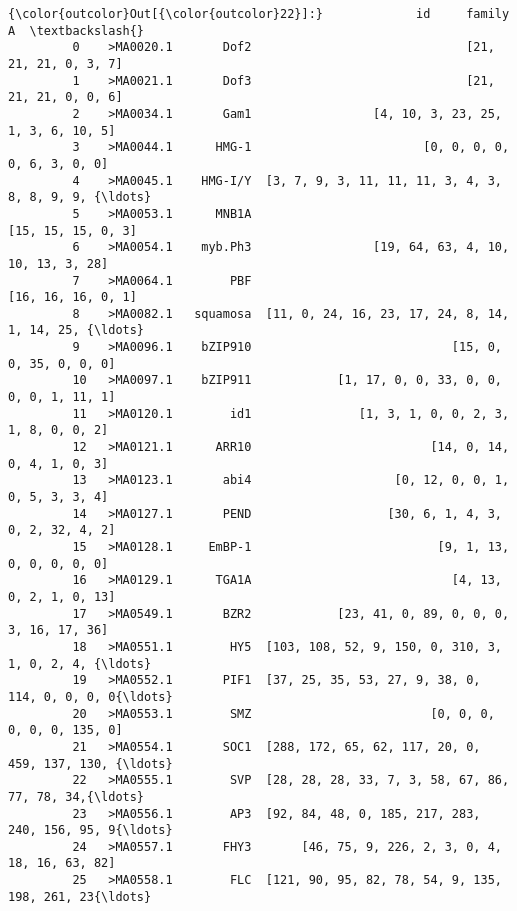\documentclass[11pt]{article}
\begin{document}
\begin{Verbatim}[commandchars=\\\{\}]
{\color{outcolor}Out[{\color{outcolor}22}]:}             id     family                                                  A  \textbackslash{}
         0    >MA0020.1       Dof2                              [21, 21, 21, 0, 3, 7]   
         1    >MA0021.1       Dof3                              [21, 21, 21, 0, 0, 6]   
         2    >MA0034.1       Gam1                 [4, 10, 3, 23, 25, 1, 3, 6, 10, 5]   
         3    >MA0044.1      HMG-1                        [0, 0, 0, 0, 0, 6, 3, 0, 0]   
         4    >MA0045.1    HMG-I/Y  [3, 7, 9, 3, 11, 11, 11, 3, 4, 3, 8, 8, 9, 9, {\ldots}   
         5    >MA0053.1      MNB1A                                 [15, 15, 15, 0, 3]   
         6    >MA0054.1    myb.Ph3                 [19, 64, 63, 4, 10, 10, 13, 3, 28]   
         7    >MA0064.1        PBF                                 [16, 16, 16, 0, 1]   
         8    >MA0082.1   squamosa  [11, 0, 24, 16, 23, 17, 24, 8, 14, 1, 14, 25, {\ldots}   
         9    >MA0096.1    bZIP910                            [15, 0, 0, 35, 0, 0, 0]   
         10   >MA0097.1    bZIP911            [1, 17, 0, 0, 33, 0, 0, 0, 0, 1, 11, 1]   
         11   >MA0120.1        id1               [1, 3, 1, 0, 0, 2, 3, 1, 8, 0, 0, 2]   
         12   >MA0121.1      ARR10                         [14, 0, 14, 0, 4, 1, 0, 3]   
         13   >MA0123.1       abi4                    [0, 12, 0, 0, 1, 0, 5, 3, 3, 4]   
         14   >MA0127.1       PEND                   [30, 6, 1, 4, 3, 0, 2, 32, 4, 2]   
         15   >MA0128.1     EmBP-1                          [9, 1, 13, 0, 0, 0, 0, 0]   
         16   >MA0129.1      TGA1A                            [4, 13, 0, 2, 1, 0, 13]   
         17   >MA0549.1       BZR2            [23, 41, 0, 89, 0, 0, 0, 3, 16, 17, 36]   
         18   >MA0551.1        HY5  [103, 108, 52, 9, 150, 0, 310, 3, 1, 0, 2, 4, {\ldots}   
         19   >MA0552.1       PIF1  [37, 25, 35, 53, 27, 9, 38, 0, 114, 0, 0, 0, 0{\ldots}   
         20   >MA0553.1        SMZ                         [0, 0, 0, 0, 0, 0, 135, 0]   
         21   >MA0554.1       SOC1  [288, 172, 65, 62, 117, 20, 0, 459, 137, 130, {\ldots}   
         22   >MA0555.1        SVP  [28, 28, 28, 33, 7, 3, 58, 67, 86, 77, 78, 34,{\ldots}   
         23   >MA0556.1        AP3  [92, 84, 48, 0, 185, 217, 283, 240, 156, 95, 9{\ldots}   
         24   >MA0557.1       FHY3       [46, 75, 9, 226, 2, 3, 0, 4, 18, 16, 63, 82]   
         25   >MA0558.1        FLC  [121, 90, 95, 82, 78, 54, 9, 135, 198, 261, 23{\ldots}   

\end{Verbatim}
\end{document}
